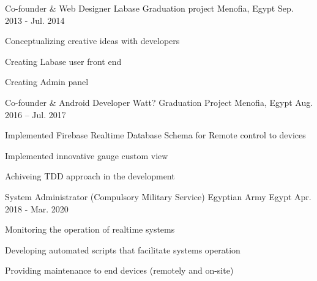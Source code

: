 

\begin{cventries}

  \cventry
    {Co-founder \& Web Designer} %
    {Labase Graduation project} %
    {Menofia, Egypt} %
    {Sep. 2013 - Jul. 2014} %
    {
      \begin{cvitems} %
        \item {Conceptualizing creative ideas with developers}
        \item {Creating Labase user front end}
        \item {Creating Admin panel}
      \end{cvitems}
    }

  \cventry
    {Co-founder \& Android Developer} %
    {Watt? Graduation Project} %
    {Menofia, Egypt} %
    {Aug. 2016 – Jul. 2017} %
    {
      \begin{cvitems} %
        \item {Implemented Firebase Realtime Database Schema for Remote control to devices}
        \item {Implemented innovative gauge custom view}
        \item {Achiveing TDD approach in the development}
      \end{cvitems}
    }

  \cventry
    {System Administrator (Compulsory Military Service)} %
    {Egyptian Army} %
    {Egypt} %
    {Apr. 2018 - Mar. 2020} %
    {
      \begin{cvitems} %
        \item {Monitoring the operation of realtime systems}
        \item {Developing automated scripts that facilitate systems operation}
        \item {Providing maintenance to end devices (remotely and on-site)}
      \end{cvitems}
    }

\end{cventries}
